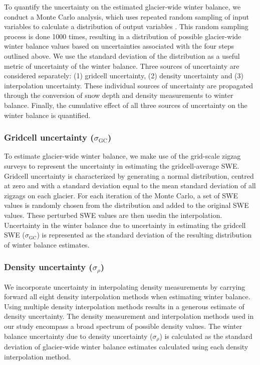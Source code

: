 \documentclass[twocolumn, letterpaper]{igs}
\begin{document}
To quantify the uncertainty on the estimated glacier-wide winter balance, we conduct a Monte Carlo analysis, which uses repeated random sampling of input variables to calculate a distribution of output variables \citep{Metropolis1949}. This random sampling process is done 1000 times, resulting in a distribution of possible glacier-wide winter balance values based on uncertainties associated with the four steps outlined above. We use the standard deviation of the distribution as a useful metric of uncertainty of the winter balance. Three sources of uncertainty are considered separately: (1) gridcell uncertainty, (2) density uncertainty and (3) interpolation uncertainty. These individual sources of uncertainty are propagated through the conversion of snow depth and density measurements to winter balance. Finally, the cumulative effect of all three sources of uncertainty on the winter balance is quantified.

	\subsubsection{Gridcell uncertainty ($\sigma_{\mathrm{GC}}$)}
To estimate glacier-wide winter balance, we make use of the grid-scale zigzag surveys to represent the uncertainty in estimating the gridcell-average SWE. Gridcell uncertainty is characterized by generating a normal distribution, centred at zero and with a standard deviation equal to the mean standard deviation of all zigzags on each glacier. For each iteration of the Monte Carlo, a set of SWE values is randomly chosen from the distribution and added to the original SWE values. These perturbed SWE values are then usedin the interpolation. Uncertainty in the winter balance due to uncertainty in estimating the gridcell SWE ($\sigma_{\mathrm{GC}}$) is represented as the standard deviation of the resulting distribution of winter balance estimates.  

	\subsubsection{Density uncertainty ($\sigma_{\rho}$)}
We incorporate uncertainty in interpolating density measurements by carrying forward all eight density interpolation methods when estimating winter balance. Using multiple density interpolation methods results in a generous estimate of density uncertainty. The density measurement and interpolation methods used in our study encompass a broad spectrum of possible density values. The winter balance uncertainty due to density uncertainty ($\sigma_{\rho}$) is calculated as the standard deviation of glacier-wide winter balance estimates calculated using each density interpolation method.
\end{document}
